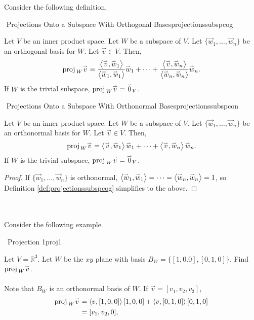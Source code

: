         Consider the following definition.
        \begin{definition}{\Stop\,\,Projections Onto a Subspace With Orthogonal Bases}{projectionssubspcog}

            Let \(V\) be an inner product space. Let \(W\) be a subspace of \(V\). Let \(\{\vec{w}_1,\ldots,\vec{w}_n\}\) be an orthogonal basis for \(W\). Let \(\vec{v}\in V\). Then,
            \begin{equation*}
                \text{proj\,}_W{\overset{_{\rightharpoonup}}{v}}=\frac{\left\langle \overset{_{\rightharpoonup}}{v},\overset{_{\rightharpoonup}}{w}_1\right\rangle}{\left\langle \overset{_{\rightharpoonup}}{w}_1,\overset{_{\rightharpoonup}}{w}_1\right\rangle}\overset{_{\rightharpoonup}}{w}_1+\cdots+\frac{\left\langle \overset{_{\rightharpoonup}}{v},\overset{_{\rightharpoonup}}{w}_n\right\rangle}{\left\langle \overset{_{\rightharpoonup}}{w}_n,\overset{_{\rightharpoonup}}{w}_n\right\rangle}\overset{_{\rightharpoonup}}{w}_n.
            \end{equation*}
            If \(W\) is the trivial subspace, \(\text{proj\,}_W{\overset{_{\rightharpoonup}}{v}}=\overset{_{\rightharpoonup}}{0}_V\).
        \end{definition}
        \begin{theorem}{\Stop\,\,Projections Onto a Subspace With Orthonormal Bases}{projectionssubspcon}

            Let \(V\) be an inner product space. Let \(W\) be a subspace of \(V\). Let \(\{\vec{w}_1,\ldots,\vec{w}_n\}\) be an orthonormal basis for \(W\). Let \(\vec{v}\in V\). Then,
            \begin{equation*}
                \text{proj\,}_W{\overset{_{\rightharpoonup}}{v}}=\left\langle \overset{_{\rightharpoonup}}{v},\overset{_{\rightharpoonup}}{w}_1\right\rangle\overset{_{\rightharpoonup}}{w}_1+\cdots+\left\langle \overset{_{\rightharpoonup}}{v},\overset{_{\rightharpoonup}}{w}_n\right\rangle\overset{_{\rightharpoonup}}{w}_n.
            \end{equation*}
            If \(W\) is the trivial subspace, \(\text{proj\,}_W{\overset{_{\rightharpoonup}}{v}}=\overset{_{\rightharpoonup}}{0}_V\).
            \begin{proof}
                If \(\{\vec{w}_1,\ldots,\vec{w}_n\}\) is orthonormal, \(\left\langle \overset{_{\rightharpoonup}}{w}_1,\overset{_{\rightharpoonup}}{w}_1\right\rangle=\cdots=\left\langle \overset{_{\rightharpoonup}}{w}_n,\overset{_{\rightharpoonup}}{w}_n\right\rangle=1\), so Definition \ref{def:projectionssubspcog} simplifies to the above.
            \end{proof}
        \end{theorem}
        \vphantom
        \\
        \\
        Consider the following example.
        \begin{example}{\Difficulty\,\Difficulty\,\,Projection 1}{proj1}

            Let \(V=\mathbb{R}^3\). Let \(W\) be the \(xy\) plane with basis \(B_W=\{[1,0.0],[0,1,0]\}\). Find \(\text{proj\,}_W{\overset{_{\rightharpoonup}}{v}}\).
            \\
            \\
            Note that \(B_W\) is an orthonormal basis of \(W\). If \(\vec{v}=[v_1,v_2,v_3]\),
            \begin{align*}
                \text{proj\,}_W\overset{_{\rightharpoonup}}{v}&=\left\langle v,[1,0,0]\right\rangle[1,0,0]+\left\langle v,[0,1,0]\right\rangle[0,1,0] \\
                &=[v_1,v_2,0],
            \end{align*}
            
        \end{example}
